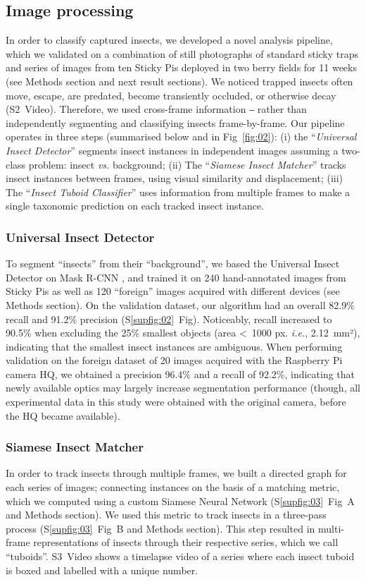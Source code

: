 \documentclass[12pt]{article}
\begin{document}
\begin{linenumbers}
		
		\subsection*{Image processing}
		In order to classify captured insects, we developed a novel analysis pipeline, which we validated on a combination of still photographs of standard sticky traps and series of images from ten Sticky Pis deployed in two berry fields for 11 weeks (see Methods section and next result sections). We noticed trapped insects often move, escape, are predated, become transiently occluded, or otherwise decay (S2~Video). Therefore, we used cross-frame information ‒ rather than independently segmenting and classifying insects frame-by-frame. Our pipeline operates in three steps (summarised below and in Fig~\ref{fig:02}): 
		(i) the “\emph{Universal Insect Detector}” segments insect instances in independent images assuming a two-class problem: insect \emph{vs.} background;
		(ii) The “\emph{Siamese Insect Matcher}” tracks insect instances between frames, using visual similarity and displacement;
		(iii) The “\emph{Insect Tuboid Classifier}” uses information from multiple frames to make a single taxonomic prediction on each tracked insect instance.
		
		\subsubsection*{Universal Insect Detector}
		To segment “insects” from their “background”, we based the Universal Insect Detector on Mask R-CNN \cite{he_mask_2017}, and trained it on 240 hand-annotated images from Sticky Pis as well as  120 ``foreign'' images acquired with different devices (see Methods section).
		On the validation dataset, our algorithm had an overall 82.9\% recall and 91.2\% precision (S\ref{supfig:02}~Fig). Noticeably, recall increased to 90.5\% when excluding the 25\% smallest objects (area <~1000 px. \emph{i.e.}, 2.12~mm²), indicating that the smallest insect instances are ambiguous.
		When performing validation on the foreign dataset of 20 images acquired with  the Raspberry Pi camera HQ, we obtained a precision 96.4\% and a recall of 92.2\%, indicating that newly available optics may largely increase segmentation performance (though, all experimental data in this study were obtained with the original camera, before the HQ became available).
		
		\subsubsection*{Siamese Insect Matcher}
		In order to track insects through multiple frames, we built a directed graph for each series of images; connecting instances on the basis of a matching metric, which we computed using a custom Siamese Neural Network (S\ref{supfig:03}~Fig~A and Methods section). We used this metric to track insects in a three-pass process (S\ref{supfig:03}~Fig~B and Methods section). This step resulted in multi-frame representations of insects through their respective series, which we call “tuboids”. S3~Video shows a timelapse video of a series where each insect tuboid is boxed and labelled with a unique number.
		

\end{linenumbers}
\end{document}
